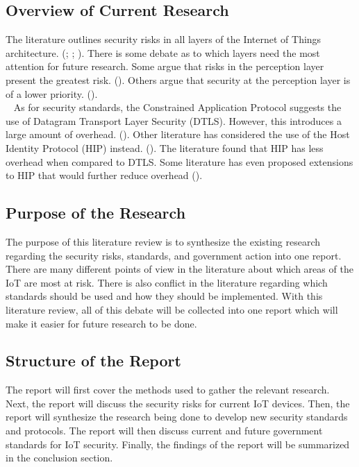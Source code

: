 \documentclass[letterpaper, 12pt]{article}
\begin{document}
\begin{flushleft}
\subsection*{Overview of Current Research}
The literature outlines security risks in all layers of the Internet of Things architecture. (\cite{Xiaohui6643029}; \cite{Zhao6746513}; \cite{Suo6188257}). 
There is some debate as to which layers need the most attention for future research. Some argue that risks in the perception layer present the greatest risk. (\cite{Zhao6746513}).
Others argue that security at the perception layer is of a lower priority. (\cite{Kozlov}). \\
~\newline
As for security standards, the Constrained Application Protocol suggests the use of Datagram Transport Layer Security (DTLS). However, this introduces a large amount of overhead. (\cite{Capossele}).  
Other literature has considered the use of the Host Identity Protocol (HIP) instead. (\cite{Garcia-Morchon:2013:SII:2462096.2462117}). The literature found that HIP has less overhead when compared to
DTLS. Some literature has even proposed extensions to HIP that would further reduce overhead (\cite{Hummen}).

\subsection*{Purpose of the Research}
The purpose of this literature review is to synthesize the existing research regarding the security risks, standards, and government action into one report. There are many different points of view in the
literature about which areas of the IoT are most at risk. There is also conflict in the literature regarding which standards should be used and how they should be implemented. With this literature review,
all of this debate will be collected into one report which will make it easier for future research to be done. 

\subsection*{Structure of the Report}
The report will first cover the methods used to gather the relevant research. Next, the report will discuss the security risks for current IoT devices. Then, the report will synthesize the research being
done to develop new security standards and protocols. The report will then discuss current and future government standards for IoT security. Finally, the findings of the report will be summarized in the conclusion
section.


\end{flushleft}
\end{document}
